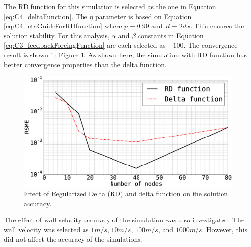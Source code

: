 The RD function for this simulation is selected as the one in Equation \eqref{eq:C4_deltaFunction}. The $\eta$ parameter is based on Equation \eqref{eq:C4_etaGuideForRDfunction} where $p = 0.99$ and $R = 2dx$. This ensures the solution stability. For this analysis, $\alpha$ and $\beta$ constants in Equation \eqref{eq:C3_feedbackForcingFunction} are each selected as $-100$. The convergence result is shown in Figure \ref{fig:C4_virtualBoundary_RDvsD}. As shown here, the simulation with RD function has better convergence properties than the delta function.
%
\begin{figure}[H]
    \centering
    \includegraphics[width=12.00cm]{Chapter_4/figure/effect_of_RD_on_simulation_vs_numberOfNodes_1D_problem.eps}
    \caption{Effect of Regularized Delta (RD) and delta function on the solution accuracy.}
    \label{fig:C4_virtualBoundary_RDvsD}
\end{figure}
%
The effect of wall velocity accuracy of the simulation was also investigated. The wall velocity was selected as $1 m/s$, $10 m/s$, $100 m/s$, and $1000 m/s$. However, this did not affect the accuracy of the simulations.


